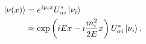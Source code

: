 \documentclass[../thesis.tex]{subfiles}
\begin{document}
\begin{equation}
  \begin{aligned}
    \label{eq:nuStateSpacetimeDep}
    \ket{\nu(x)} &= e^{ip_i x} U^*_{\alpha i}\ket{\nu_i} \\
    &\approx \exp \left( iEx - i\frac{m_i^2}{2E}x \right) U^*_{\alpha i}\ket{\nu_i}.
  \end{aligned}
\end{equation}


\begin{comment}
To calculate the oscillation probability over baseline $L$ for a neutrino of energy $E$ and initial flavor $\alpha$, we first redefine the problem slightly and consider a neutrino plane wave $\ket{\nu(t)}$ of initial flavor $\alpha$ and well-defined \emph{momentum} $\vec{p}$, such that \(E = |\vec{p}|\).\footnote{One could instead assume a well-defined \emph{energy}, or even \emph{velocity}, and the end result would be the same to leading order. The advantage of fixing the momentum is that it provides a spatially uniform flavor composition at all times, so we need only worry about the time dependence.} This state contains components of three different energies, one for each mass eigenstate. For clarity, flavor and mass eigenstates will be labeled with the superscripts F and M, respectively. Following \cite{Giunti_2007}, we have
\begin{equation}
  \ket{\nu(0)} = \ket{\nuF_\alpha} = U^*_{\alpha i} \ket{\nuM_i}. 
\end{equation}
In natural units ($c = \hbar = 1$), this state evolves in time like
\begin{equation}
  \ket{\nu(t)} = e^{-i E_i t} U^*_{\alpha i} \ket{\nuM_i}.
\end{equation}
Given that we've fixed the momentum $\vec{p}$, the energy $E_i$ of the $i$th mass eigenstate component of $\ket{\nu}$ is
\begin{equation}
  E_i = \sqrt{p^2 + m_i^2} \approx p + \frac{m_i^2}{2p} \equiv E +
  \frac{m_i^2}{2E}.
\end{equation}
\end{comment}
\end{document}
